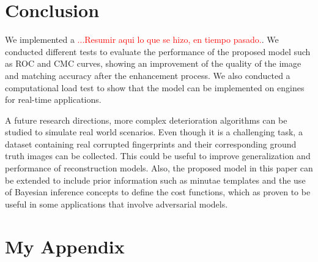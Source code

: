 \documentclass[a4paper,fleqn]{cas-dc}
\begin{document}
\section{Conclusion}
\label{sec:CON}
\label{sec:FW}
We implemented a \textcolor{red}{...Resumir aqui lo que se hizo, en tiempo pasado.}. We conducted different tests to evaluate the performance of the proposed model such as ROC and CMC curves, showing an improvement of the quality of the image and matching accuracy after the enhancement process. We also conducted a computational load test to show that the model can be implemented on engines for real-time applications. 


A future research directions, more complex deterioration algorithms can be studied to simulate real world scenarios. Even though it is a challenging task, a dataset containing real corrupted fingerprints and their corresponding ground truth images can be collected. This could be useful to improve generalization and performance of reconstruction models. Also, the proposed model in this paper can be extended to include prior information such as minutae templates and the use of Bayesian inference concepts to define the cost functions, which as proven to be useful in some applications that involve adversarial models.

\printcredits

%






\onecolumn
\appendix
\section{My Appendix}
\end{document}

